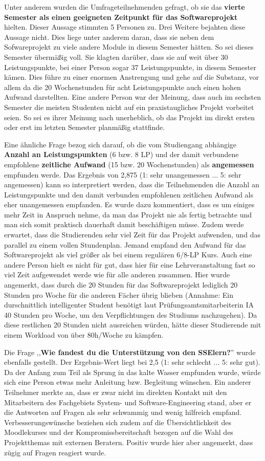 \documentclass[../review_3.tex]{subfiles}
\begin{document}
Unter anderem wurden die Umfrageteilnehmenden gefragt, ob sie das \textbf{vierte Semester als einen geeigneten Zeitpunkt für das Softwareprojekt} hielten. Dieser Aussage stimmten 5 Personen zu. Drei Weitere bejahten diese Aussage nicht. Dies liege unter anderem daran, dass sie neben dem Sofwareprojekt zu viele andere Module in diesem Semester hätten. So sei dieses Semester übermäßig voll. Sie klagten darüber, dass sie auf weit über 30 Leistungspunkte, bei einer Person sogar 37 Leistungspunkte, in diesem Semester kämen. Dies führe zu einer enormen Anstrengung und gehe auf die Substanz, vor allem da die 20 Wochenstunden für acht Leistungspunkte auch einen hohen Aufwand darstellten. Eine andere Person war der Meinung, dass auch im sechsten Semester die meisten Studenten nicht auf ein praxistaugliches Projekt vorbeitet seien. So sei es ihrer Meinung nach unerheblich, ob das Projekt im direkt ersten oder erst im letzten Semester planmäßig stattfinde.

Eine ähnliche Frage bezog sich darauf, ob die vom Studiengang abhängige \textbf{Anzahl an Leistungspunkten} (6 bzw. 8 LP) und der damit verbundene empfohlene \textbf{zeitliche Aufwand} (15 bzw. 20 Wochenstunden) als \textbf{angemessen} empfunden werde. Das Ergebnis von 2,875 (1: sehr unangemessen ... 5: sehr angemessen) kann so interpretiert werden, dass die Teilnehmenden die Anzahl an Leistungspunkte und den damit verbunden empfohlenen zeitlichen Aufwand als eher unangemessen empfanden. Es wurde dazu kommentiert, dass es um einiges mehr Zeit in Anspruch nehme, da man das Projekt nie als fertig betrachte und man sich somit praktisch dauerhaft damit beschäftigen müsse. Zudem werde erwartet, dass die Studierenden sehr viel Zeit für das Projekt aufwenden, und das parallel zu einem vollen Stundenplan. Jemand empfand den Aufwand für das Softwareprojekt als viel größer als bei einem regulären 6/8-LP Kurs. Auch eine andere Person hielt es nicht für gut, dass hier für eine Lehrveranstaltung fast so viel Zeit aufgewendet werde wie für alle anderen zusammen. Hier wurde angemerkt, dass durch die 20 Stunden für das Softwareprojekt lediglich 20 Stunden pro Woche für die anderen Fächer übrig blieben (Annahme: Ein durschnittlich intelligenter Student benötigt laut Prüfungsamtsmitarbeiterin IA 40 Stunden pro Woche, um den Verpflichtungen des Studiums nachzugehen). Da diese restlichen 20 Stunden nicht ausreichen würden, hätte dieser Studierende mit einem Workload von über 80h/Woche zu kämpfen.

Die Frage ,,\textbf{Wie fandest du die Unterstützung von den SSElern?}'' wurde ebenfalls gestellt. Der Ergebnis-Wert liegt bei 2,5 (1: sehr schlecht ... 5: sehr gut). Da der Anfang zum Teil als Sprung in das kalte Wasser empfunden wurde, würde sich eine Person etwas mehr Anleitung bzw. Begleitung wünschen. Ein anderer Teilnehmer merkte an, dass er zwar nicht im direkten Kontakt mit den Mitarbeitern des Fachgebiets System- und Software-Engineering stand, aber er die Antworten auf Fragen als sehr schwammig und wenig hilfreich empfand.  Verbesserungswünsche beziehen sich zudem auf die Übersichtlichkeit des Moodlekurses und der Kompromissbereitschaft bezogen auf die Wahl des Projektthemas mit externen Beratern. Positiv wurde hier aber angemerkt, dass zügig auf Fragen reagiert wurde.
\end{document}
